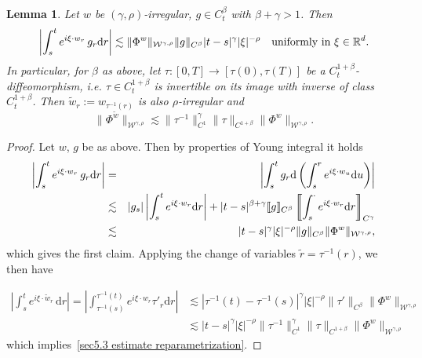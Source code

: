 \documentclass[10pt]{article}
\newcommand{\assign}{:=}
\newcommand{\comma}{{,}}
\newcommand{\mathd}{\mathrm{d}}
\newcommand{\tmcolor}[2]{{\color{#1}{#2}}}
\newtheorem{lemma}[theorem]{Lemma}
\begin{document}
\begin{lemma}
  \label{sec5.2 lemma time reparametrization}Let $w$ be $(\gamma,
  \rho)$-irregular, $g \in C^{\beta}_t$ with $\beta + \gamma > 1$. Then
  \[ \left| \int_s^t e^{i \xi \cdot w_r} \, g_r \mathd r \right| \lesssim
     \tmcolor{black}{{\| \Phi^w \|_{\mathcal{W}^{\gamma \comma \rho}}} } \| g
     \|_{C^{\beta}} | t - s |^{\gamma} | \xi |^{- \rho} \quad \text{uniformly
     in $\xi \in \mathbb{R}^d$.} \]
  In particular, for $\beta$ as above, let $\tau : [0, T] \rightarrow [\tau
  (0), \tau (T)]$ be a $C_t^{1 + \beta}$-diffeomorphism, i.e. $\tau \in C_t^{1
  + \beta}$ is invertible on its image with inverse of class $C_t^{1 +
  \beta}$. Then $\tilde{w}_r \assign w_{\tau^{- 1} (r)}$ is also
  $\rho$\mbox{-}irregular and
  \begin{equation}
    {\| \Phi^{\tilde{w}} \|_{\mathcal{W}^{\gamma \comma \rho}}}  \lesssim \|
    \tau^{- 1} \|_{C^1}^{\gamma} \| \tau \|_{C^{1 + \beta}} \| \Phi^w
    \|_{\mathcal{W}^{\gamma \comma \rho}} . \label{sec5.3 estimate
    reparametrization}
  \end{equation}
\end{lemma}

\begin{proof}
  Let $w$, $g$ be as above. Then by properties of Young integral it holds
  \begin{eqnarray*}
    \left| \int_s^t e^{i \xi \cdot w_r} \, g_r \mathd r \right| & = & \left|
    \int_s^t g_r \mathd \left( \int_s^r e^{i \xi \cdot w_u} \mathd u \right)
    \right|\\
    & \lesssim & | g_s | \left| \int_s^t e^{i \xi \cdot w_r} \mathd r \right|
    + | t - s |^{\beta + \gamma} \llbracket g \rrbracket_{C^{\beta}}
    \left\llbracket \int_s^{\cdot} e^{i \xi \cdot w_r} \mathd r
    \right\rrbracket_{C^{\gamma}}\\
    & \lesssim & | t - s |^{\gamma} | \xi |^{- \rho} \| g \|_{C^{\beta}}
    \tmcolor{black}{\| \Phi^w \|_{\mathcal{W}^{\gamma \comma \rho}}},
  \end{eqnarray*}
  which gives the first claim. Applying the change of variables $\tilde{r} =
  \tau^{- 1} (r)$, we then have
  
  \begin{align*}
    \left| \int_s^t e^{i \xi \cdot \tilde{w}_r} \, \mathd r \right| = \left|
    \int_{\tau^{- 1} (s)}^{\tau^{- 1} (t)} e^{i \xi \cdot w_r} \tau'_r \mathd
    r \right| & \lesssim | \tau^{- 1} (t) - \tau^{- 1} (s) |^{\gamma} | \xi
    |^{- \rho} \| \tau' \|_{C^{\beta}} \| \Phi^w \|_{\mathcal{W}^{\gamma,
    \rho}}\\
    & \lesssim | t - s |^{\gamma} | \xi |^{- \rho} \| \tau^{- 1}
    \|^{\gamma}_{C^1} \| \tau \|_{C^{1 + \beta}} \| \Phi^w
    \|_{\mathcal{W}^{\gamma \comma \rho}}
  \end{align*}
%  
  which implies~\eqref{sec5.3 estimate reparametrization}.
\end{proof}
\end{document}
